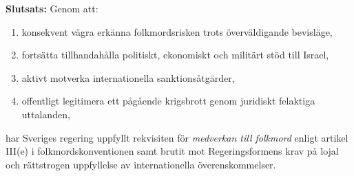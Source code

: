 \vspace{0.5cm}

\noindent
\textbf{Slutsats:} Genom att:

\begin{enumerate}
    \item konsekvent vägra erkänna folkmordsrisken trots överväldigande bevisläge,
    \item fortsätta tillhandahålla politiskt, ekonomiskt och militärt stöd till Israel,
    \item aktivt motverka internationella sanktionsåtgärder,
    \item offentligt legitimera ett pågående krigsbrott genom juridiskt felaktiga uttalanden,
\end{enumerate}

har Sveriges regering uppfyllt rekvisiten för \textit{medverkan till folkmord} enligt artikel III(e) i folkmordskonventionen samt brutit mot Regeringsformens krav på lojal och rättstrogen uppfyllelse av internationella överenskommelser.


